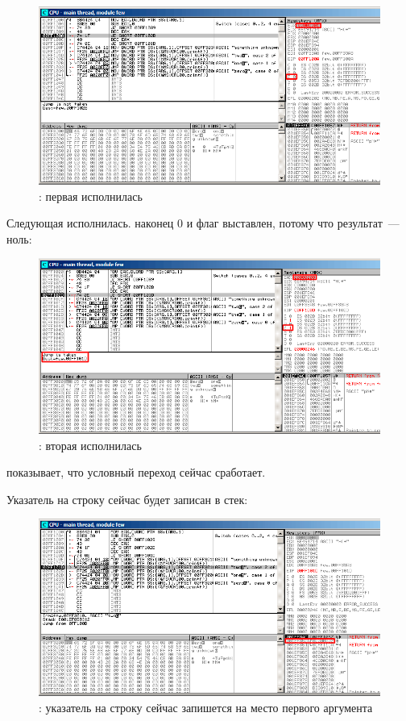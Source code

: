 \begin{figure}[H]
\centering
\includegraphics[scale=\FigScale]{patterns/08_switch/1_few/olly3.png}
\caption{\olly: первая \DEC исполнилась}
\label{fig:switch_few_olly3}
\end{figure}

\clearpage
Следующая \DEC исполнилась. 
\EAX наконец 0 и флаг \ZF выставлен, потому что результат~--- ноль:

\begin{figure}[H]
\centering
\includegraphics[scale=\FigScale]{patterns/08_switch/1_few/olly4.png}
\caption{\olly: вторая \DEC исполнилась}
\label{fig:switch_few_olly4}
\end{figure}

\olly показывает, что условный переход сейчас сработает.

\clearpage
Указатель на строку  
сейчас будет записан в стек:

\begin{figure}[H]
\centering
\includegraphics[scale=\FigScale]{patterns/08_switch/1_few/olly5.png}
\caption{\olly: указатель на строку сейчас запишется на место первого аргумента}
\label{fig:switch_few_olly5}
\end{figure}

